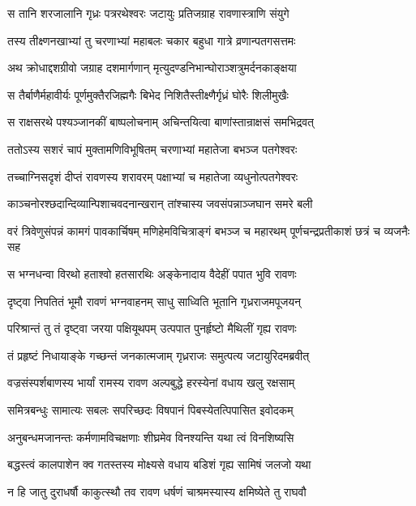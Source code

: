 \twolineshloka
{स तानि शरजालानि गृध्रः पत्ररथेश्वरः}
{जटायुः प्रतिजग्राह रावणास्त्राणि संयुगे} %

\twolineshloka
{तस्य तीक्ष्णनखाभ्यां तु चरणाभ्यां महाबलः}
{चकार बहुधा गात्रे व्रणान्पतगसत्तमः} %

\twolineshloka
{अथ क्रोधाद्दशग्रीवो जग्राह दशमार्गणान्}
{मृत्युदण्डनिभान्घोराञ्शत्रुमर्दनकाङ्क्षया} %

\twolineshloka
{स तैर्बाणैर्महावीर्यः पूर्णमुक्तैरजिह्मगैः}
{बिभेद निशितैस्तीक्ष्णैर्गृध्रं घोरैः शिलीमुखैः} %

\twolineshloka
{स राक्षसरथे पश्यञ्जानकीं बाष्पलोचनाम्}
{अचिन्तयित्वा बाणांस्तान्राक्षसं समभिद्रवत्} %

\twolineshloka
{ततोऽस्य सशरं चापं मुक्तामणिविभूषितम्}
{चरणाभ्यां महातेजा बभञ्ज पतगेश्वरः} %

\twolineshloka
{तच्चाग्निसदृशं दीप्तं रावणस्य शरावरम्}
{पक्षाभ्यां च महातेजा व्यधुनोत्पतगेश्वरः} %

\twolineshloka
{काञ्चनोरश्छदान्दिव्यान्पिशाचवदनान्खरान्}
{तांश्चास्य जवसंपन्नाञ्जघान समरे बली} %

\threelineshloka
{वरं त्रिवेणुसंपन्नं कामगं पावकार्चिषम्}
{मणिहेमविचित्राङ्गं बभञ्ज च महारथम्}
{पूर्णचन्द्रप्रतीकाशं छत्रं च व्यजनैः सह} %

\twolineshloka
{स भग्नधन्वा विरथो हताश्वो हतसारथिः}
{अङ्केनादाय वैदेहीं पपात भुवि रावणः} %

\twolineshloka
{दृष्ट्वा निपतितं भूमौ रावणं भग्नवाहनम्}
{साधु साध्विति भूतानि गृध्रराजमपूजयन्} %

\twolineshloka
{परिश्रान्तं तु तं दृष्ट्वा जरया पक्षियूथपम्}
{उत्पपात पुनर्हृष्टो मैथिलीं गृह्य रावणः} %

\twolineshloka
{तं प्रहृष्टं निधायाङ्के गच्छन्तं जनकात्मजाम्}
{गृध्रराजः समुत्पत्य जटायुरिदमब्रवीत्} %

\twolineshloka
{वज्रसंस्पर्शबाणस्य भार्यां रामस्य रावण}
{अल्पबुद्धे हरस्येनां वधाय खलु रक्षसाम्} %

\twolineshloka
{समित्रबन्धुः सामात्यः सबलः सपरिच्छदः}
{विषपानं पिबस्येतत्पिपासित इवोदकम्} %

\twolineshloka
{अनुबन्धमजानन्तः कर्मणामविचक्षणाः}
{शीघ्रमेव विनश्यन्ति यथा त्वं विनशिष्यसि} %

\twolineshloka
{बद्धस्त्वं कालपाशेन क्व गतस्तस्य मोक्ष्यसे}
{वधाय बडिशं गृह्य सामिषं जलजो यथा} %

\twolineshloka
{न हि जातु दुराधर्षौ काकुत्स्थौ तव रावण}
{धर्षणं चाश्रमस्यास्य क्षमिष्येते तु राघवौ} %

